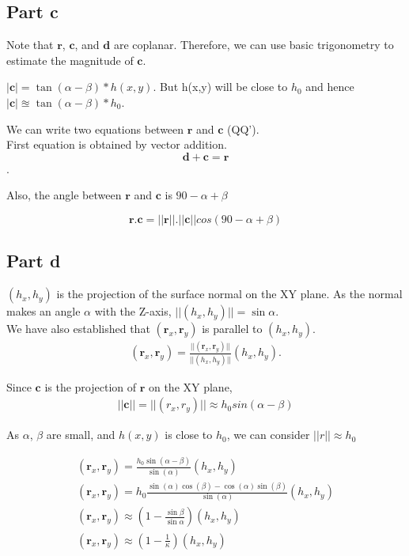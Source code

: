\documentclass[11pt]{article}
\begin{document}
\subsection*{Part c}
Note that $\mathbf{r}$, $\mathbf{c}$, and $\mathbf{d}$ are coplanar. Therefore, we can use basic trigonometry to estimate the magnitude of $\mathbf{c}$.

$|\mathbf{c}| = \tan(\alpha-\beta) * h(x,y)$. But h(x,y) will be close to $h_{0}$ and hence $|\mathbf{c}| \approxeq \tan(\alpha-\beta) * h_{0}$.

We can write two equations between $\mathbf{r}$ and $\mathbf{c}$ (QQ').\\
First equation is obtained by vector addition.
$$ \mathbf{d} + \mathbf{c} = \mathbf{r}$$.


Also, the angle between $\mathbf{r}$ and $\mathbf{c}$ is $90 - \alpha + \beta$

$$ \mathbf{r}.\mathbf{c} = ||\mathbf{r}||.||\mathbf{c}|| cos(90 - \alpha + \beta) $$

\subsection*{Part d}

$(h_{x},h_{y})$ is the projection of the surface normal on the XY plane. As the normal makes an angle $\alpha$ with the Z-axis, $||(h_{x},h_{y})|| = \sin\alpha$.\\

We have also established that $(\mathbf{r}_{x},\mathbf{r}_{y})$ is parallel to $(h_{x},h_{y})$.
\begin{gather*}
(\mathbf{r}_{x},\mathbf{r}_{y}) =  \frac{||(\mathbf{r}_{x},\mathbf{r}_{y})||}{||(h_{x},h_{y})||}(h_{x},h_{y}).
\end{gather*}

Since $\mathbf{c}$ is the projection of $\mathbf{r}$ on the XY plane,
\begin{gather*}
||\mathbf{c}|| = ||(r_{x},r_{y})|| \approx h_{0} sin(\alpha-\beta)
\end{gather*}


As $\alpha$, $\beta$ are small, and $h(x,y)$ is close to $h_{0}$, we can consider $||r|| \approx h_{0}$

\begin{gather*}
(\mathbf{r}_{x},\mathbf{r}_{y}) = \frac{h_{0} \sin(\alpha-\beta)}{\sin(\alpha)} (h_{x},h_{y})\\
(\mathbf{r}_{x},\mathbf{r}_{y}) = h_{0} \frac{\sin(\alpha)\cos(\beta) - \cos(\alpha)\sin(\beta)}{\sin(\alpha)} (h_{x},h_{y})\\
(\mathbf{r}_{x},\mathbf{r}_{y}) \approx (1-\frac{\sin\beta}{\sin\alpha}) (h_{x},h_{y})\\
(\mathbf{r}_{x},\mathbf{r}_{y}) \approx (1-\frac{1}{\kappa}) (h_{x},h_{y})\\
\end{gather*}
\end{document}
